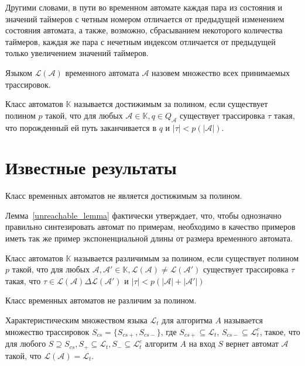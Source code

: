 \documentclass[times,specification,annotation]{itmo-student-thesis}
\begin{document}
Другими словами, в пути во временном автомате каждая пара из состояния и значений таймеров с четным номером отличается от предыдущей изменением состояния автомата, а также, возможно, сбрасыванием некоторого количества таймеров, каждая же пара с нечетным индексом отличается от предыдущей только увеличением значений таймеров.

\begin{definition}
  Языком $\mathcal{L}(\mathcal{A})$ временного автомата $\mathcal{A}$ назовем множество всех принимаемых трассировок.
\end{definition}

\begin{definition}
  Класс автоматов $\mathbb{K}$ называется достижимым за полином, если существует полином $p$ такой, что для любых
  $\mathcal{A} \in \mathbb{K}, q \in Q_{\mathcal{A}}$ существует трассировка $\tau$ такая, что порожденный ей путь заканчивается в $q$ и $|\tau| < p(|\mathcal{A}|)$.
\end{definition}

\section{Известные результаты}
\begin{lemma}
  Класс временных автоматов не является достижимым за полином.
  \label{unreachable_lemma}
\end{lemma}

Лемма~\ref{unreachable_lemma} фактически утверждает, что, чтобы однозначно правильно синтезировать автомат по примерам, необходимо в качество примеров иметь так же пример экспоненциальной длины от размера временного автомата.

\begin{definition}
  Класс автоматов $\mathbb{K}$ называется различимым за полином, если существует полином $p$ такой, что для любых
  $\mathcal{A}, \mathcal{A'} \in \mathbb{K}, \mathcal{L}(\mathcal{A}) \neq \mathcal{L}(\mathcal{A'})$ существует трассировка $\tau$ такая, что 
  $\tau \in \mathcal{L}(\mathcal{A}) \Delta \mathcal{L}(\mathcal{A'})$ и $|\tau| < p(|\mathcal{A}| + |\mathcal{A'}|)$
\end{definition}

\begin{lemma}
  Класс временных автоматов не различим за полином.
  \label{distinguishability_lemma}
\end{lemma}

\begin{definition}
    Характеристическим множеством языка $\mathcal{L}_t$ для алгоритма $A$ называется множество трассировок $S_{cs} = \{S_{cs+}, S_{cs-}\}$, где
  $S_{cs+} \subseteq \mathcal{L}_t$, $S_{cs-} \subseteq \mathcal{L}_t^c$, такое, что 
  для любого $S \supseteq S_{cs}, S_+ \subseteq \mathcal{L}_t, S_- \subseteq \mathcal{L}_t^c$ алгоритм $A$ на вход $S$ вернет автомат $\mathcal{A}$ такой, что $\mathcal{L}(\mathcal{A}) = \mathcal{L}_t$.
\end{definition}
\end{document}
